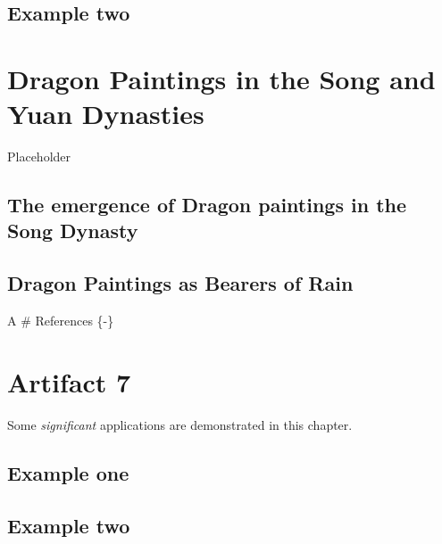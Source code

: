 \documentclass[
]{book}
\begin{document}
\hypertarget{example-two}{%
\section{Example two}\label{example-two}}

\hypertarget{Dragon_Paintings}{%
\chapter*{Dragon Paintings in the Song and Yuan Dynasties}\label{Dragon_Paintings}}

Placeholder

\hypertarget{the-emergence-of-dragon-paintings-in-the-song-dynasty}{%
\section*{The emergence of Dragon paintings in the Song Dynasty}\label{the-emergence-of-dragon-paintings-in-the-song-dynasty}}

\hypertarget{dragon-paintings-as-bearers-of-rain}{%
\section*{Dragon Paintings as Bearers of Rain}\label{dragon-paintings-as-bearers-of-rain}}

A
\# References \{-\}

\hypertarget{artifact7}{%
\chapter*{Artifact 7}\label{artifact7}}

Some \emph{significant} applications are demonstrated in this chapter.

\hypertarget{example-one}{%
\section{Example one}\label{example-one}}

\hypertarget{example-two}{%
\section{Example two}\label{example-two}}

  
\end{document}
